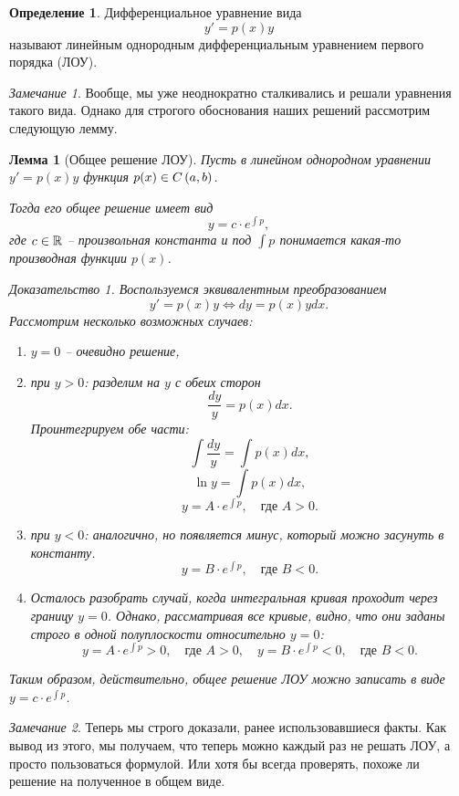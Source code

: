\documentclass[a5paper, 10pt]{article}
\theoremstyle{definition}
\newtheorem{Def}{Определение}
\theoremstyle{plain}
\newtheorem{Lem}{Лемма}
\theoremstyle{remark}
\newtheorem*{Note}{Замечание}
\newtheorem*{Proof}{Доказательство}
\begin{document}
	\begin{Def}
		Дифференциальное уравнение вида 
		\begin{equation}
			y' = p(x) y
		\end{equation}
		называют линейным однородным дифференциальным уравнением первого порядка (\textsc{ЛОУ}).
	\end{Def}
	\begin{Note}
		Вообще, мы уже неоднократно сталкивались и решали уравнения такого вида. Однако для строгого обоснования наших решений рассмотрим следующую лемму.
	\end{Note}
	\begin{Lem}[Общее решение ЛОУ]
		Пусть в линейном однородном уравнении $y' = p(x) y$ функция $p(x) \in C\left(a,b\right)$.
		
		Тогда его общее решение имеет вид \begin{equation}
			y = c\cdot e^{\int\!p},
		\end{equation}
		где $c\in \mathbb{R}$ -- произвольная константа и под $\int \!p$ понимается какая-то производная функции $p(x)$.
		\begin{Proof}
			Воспользуемся эквивалентным преобразованием
			\[
			y'=p(x)y \Leftrightarrow dy = p(x) y dx.
			\]
			Рассмотрим несколько возможных случаев:
			\begin{enumerate}
				\item $y=0$ -- очевидно решение,
				\item при $y>0$: разделим на $y$ с обеих сторон
				\[
				\frac{dy}{y} = p(x) dx.
				\]
				Проинтегрируем обе части:
				\[
				\int \frac{dy}{y} = \int p(x) dx,
				\]				
				\[
				\ln y = \int p(x) dx,
				\]
				\[
				y = A\cdot e^{\int\!p}, \quad\text{где } A>0.
				\]
				\item при $y<0$: аналогично, но появляется минус, который можно засунуть в константу.
				\[
				y = B\cdot e^{\int\!p}, \quad\text{где } B<0.
				\]
				\item Осталось разобрать случай, когда интегральная кривая проходит через границу $y=0$. Однако, рассматривая все кривые, видно, что они заданы строго в одной полуплоскости относительно $y=0$:
				\[
				y = A\cdot e^{\int\!p} > 0, \quad\text{где } A>0, \quad y = B\cdot e^{\int\!p} < 0, \quad\text{где } B<0.
				\]
			\end{enumerate}
			Таким образом, действительно, общее решение ЛОУ можно записать в виде $	y = c\cdot e^{\int\!p}$.
		\end{Proof}
	\end{Lem}
	\begin{Note}
		Теперь мы строго доказали, ранее использовавшиеся факты. Как вывод из этого, мы получаем, что теперь можно каждый раз не решать ЛОУ, а просто пользоваться формулой. Или хотя бы всегда проверять, похоже ли решение на полученное в общем виде.
	\end{Note}
\end{document}
